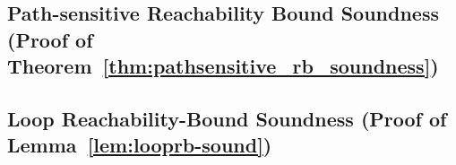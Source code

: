 \subsection{Path-sensitive Reachability Bound Soundness (Proof of Theorem~\ref{thm:pathsensitive_rb_soundness})}
\label{apdx:psrb-sound}

\clearpage

\subsection{Loop Reachability-Bound Soundness (Proof of Lemma~\ref{lem:looprb-sound})}
\label{apdx:looprb-sound}

\clearpage

